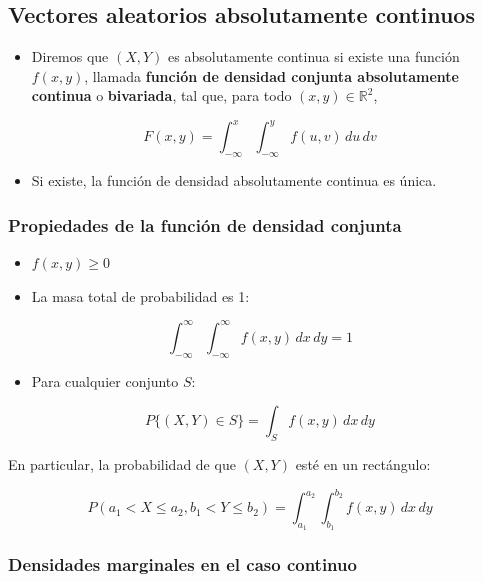 \documentclass[
]{article}
\providecommand{\tightlist}{%
  \setlength{\itemsep}{0pt}\setlength{\parskip}{0pt}}
\begin{document}
\subsection{Vectores aleatorios absolutamente continuos}\label{vectores-aleatorios-absolutamente-continuos}

\begin{itemize}
\tightlist
\item
  Diremos que \((X, Y)\) es absolutamente continua si existe una función \(f(x, y)\), llamada \textbf{función de densidad conjunta absolutamente continua} o \textbf{bivariada}, tal que, para todo \((x, y) \in \mathbb{R}^2\),
\end{itemize}

\[
F(x, y) = \int_{-\infty}^{x} \int_{-\infty}^{y} f(u, v)\, du \, dv
\]

\begin{itemize}
\tightlist
\item
  Si existe, la función de densidad absolutamente continua es única.
\end{itemize}

\subsubsection{Propiedades de la función de densidad conjunta}\label{propiedades-de-la-funciuxf3n-de-densidad-conjunta}

\begin{itemize}
\item
  \(f(x, y) \geq 0\)
\item
  La masa total de probabilidad es 1:
\end{itemize}

\[
\int_{-\infty}^{\infty} \int_{-\infty}^{\infty} f(x, y)\, dx\,dy = 1
\]

\begin{itemize}
\tightlist
\item
  Para cualquier conjunto \(S\):
\end{itemize}

\[
P\{(X, Y) \in S\} = \int_S f(x, y) \, dx \, dy
\]

En particular, la probabilidad de que \((X, Y)\) esté en un rectángulo:

\[
P(a_1 < X \leq a_2, b_1 < Y \leq b_2) = \int_{a_1}^{a_2} \int_{b_1}^{b_2} f(x, y) \, dx \, dy
\]

\subsubsection{Densidades marginales en el caso continuo}\label{densidades-marginales-en-el-caso-continuo}
\end{document}
